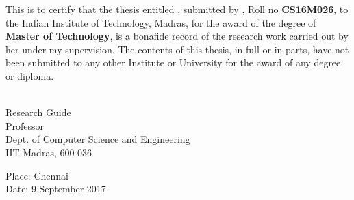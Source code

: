 \certificate
\vspace*{0.5in}
\noindent This is to certify that the thesis entitled {\bf {\thesistitle}}, 
submitted by {\bf {\thesisauthor}}, Roll no \textbf{CS16M026}, to the Indian Institute of Technology, 
Madras, for the award of the degree of {\bf Master of Technology}, 
is a bonafide record of the research work carried out by her under my
supervision. The contents of this thesis, in full or in parts, have not been
submitted to any other Institute or University for the award of any degree or diploma.
\vspace*{1.4in}
\hspace*{-0.25in}
\begin{singlespace}
 \\
\noindent Research Guide \\ 
\noindent Professor \\
\noindent Dept. of Computer Science and Engineering\\
\noindent IIT-Madras, 600 036 \\
\end{singlespace}
\vspace*{0.20in}
\noindent Place: Chennai\\ 
Date: 9 September 2017

